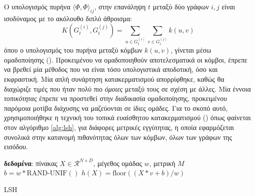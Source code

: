Ο υπολογισμός πυρήνα $\langle \Phi, \Phi \rangle_{ij}$, στην επανάληψη $t$ μεταξύ δύο γράφων $i, j$ είναι ισοδύναμος με το ακόλουθο διπλό άθροισμα:
\begin{equation}
    K(G^{(i)}_{t}, G^{(j)}_{t}) = \sum_{u \in G^{(i)}_{t}} \sum_{v \in G^{(j)}_{t}} k(u, v)
\end{equation}
όπου ο υπολογισμός του πυρήνα μεταξύ κόμβων $k(u, v)$, γίνεται μέσω ομαδοποίησης ().
Προκειμένου να ομαδοποιηθούν αποτελεσματικά οι κόμβοι, έπρεπε να βρεθεί μία μέθοδος που να είναι τόσο υπολογιστικά αποδοτική, όσο και εκφραστική.
Μία απλή συνάρτηση κατακερματισμού απορρίφθηκε, καθώς θα διαχώριζε τιμές που ήταν πολύ πιο \textit{όμοιες} μεταξύ τους σε σχέση με άλλες.
Μία έννοια \textit{τοπικότητας} έπρεπε να προστεθεί στην διαδικασία ομαδοποίησης, προκειμένου παρόμοια μοτίβα διάχυσης να μαζεύονται σε ίδιες ομάδες.
Για το σκοπό αυτό, χρησιμοποιήθηκε η τεχνική του τοπικά ευαίσθητου κατακερματισμού () όπως φαίνεται στον αλγόριθμο \ref{alg:lsh}, για διάφορες μετρικές εγγύτητας, η οποία εφαρμόζεται συνολικά στην κατανομή πιθανότητας όλων των κόμβων, όλων των γράφων της εισόδου.
\begin{algorithm}[]
\textbf{δεδομένα}: πίνακας $X \in \mathcal{R}^{N \times D}$, μέγεθος ομάδας $w$, μετρική $M$\\
$b = w*\text{RAND-UNIF}()$ 
$h(X) = \text{floor}((X*v + b)/w)$ 
\caption{ LSH}
\label{alg:lsh}
\end{algorithm}

